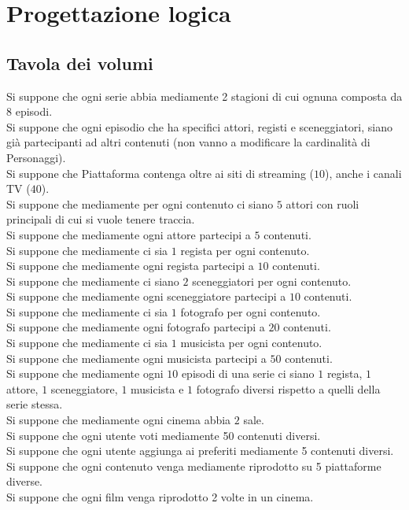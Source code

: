 \documentclass[a4paper]{article}
\begin{document}
\section{Progettazione logica}
\subsection{Tavola dei volumi}

\hfill \break
Si suppone che ogni serie abbia mediamente 2 stagioni di cui ognuna composta da 8 episodi. \\
Si suppone che ogni episodio che ha specifici attori, registi e sceneggiatori, siano 
già partecipanti ad altri contenuti (non vanno a modificare la cardinalità di Personaggi). \\
Si suppone che Piattaforma contenga oltre ai siti di streaming ($10$), anche i canali TV ($40$). \\
Si suppone che mediamente per ogni contenuto ci siano $5$ attori con ruoli principali di cui si 
vuole tenere traccia. \\
Si suppone che mediamente ogni attore partecipi a $5$ contenuti. \\
Si suppone che mediamente ci sia $1$ regista per ogni contenuto. \\
Si suppone che mediamente ogni regista partecipi a $10$ contenuti. \\
Si suppone che mediamente ci siano $2$ sceneggiatori per ogni contenuto. \\
Si suppone che mediamente ogni sceneggiatore partecipi a $10$ contenuti. \\
Si suppone che mediamente ci sia $1$ fotografo per ogni contenuto. \\
Si suppone che mediamente ogni fotografo partecipi a $20$ contenuti. \\
Si suppone che mediamente ci sia $1$ musicista per ogni contenuto. \\
Si suppone che mediamente ogni musicista partecipi a $50$ contenuti. \\
Si suppone che mediamente ogni $10$ episodi di una serie ci siano 
$1$ regista, $1$ attore, $1$ sceneggiatore, $1$ musicista e $1$ fotografo diversi
rispetto a quelli della serie stessa. \\
Si suppone che mediamente ogni cinema abbia $2$ sale. \\
Si suppone che ogni utente voti mediamente 50 contenuti diversi. \\ 
Si suppone che ogni utente aggiunga ai preferiti mediamente 5 contenuti diversi. \\
Si suppone che ogni contenuto venga mediamente riprodotto su 5 piattaforme diverse. \\
Si suppone che ogni film venga riprodotto 2 volte in un cinema. \\
\end{document}
